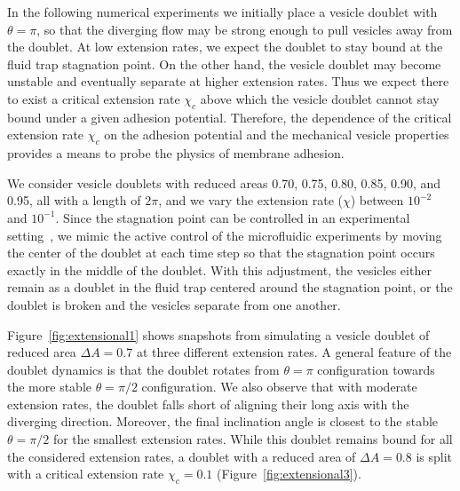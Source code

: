 \documentclass[prf,superscriptaddress,showkeys,longbibliography]{revtex4-1}
\begin{document}
In the following numerical experiments we initially place a vesicle
doublet with $\theta=\pi$, so that the diverging flow may be strong
enough to pull vesicles away from the doublet.  At low extension
rates, we expect the doublet to stay bound at the fluid trap stagnation
point.  On the other hand, the vesicle doublet may become unstable and
eventually separate at higher extension rates.  Thus we expect there
to exist a critical extension rate $\chi_c$ above which the vesicle
doublet cannot stay bound under a given adhesion potential.  Therefore,
the dependence of the critical extension rate $\chi_c$ on the adhesion
potential and the mechanical vesicle properties provides a means to
probe the physics of membrane adhesion.


We consider vesicle doublets with reduced areas 0.70, 0.75, 0.80, 0.85,
0.90, and 0.95, all with a length of $2\pi$, and we vary the extension
rate ($\chi$) between $10^{-2}$ and $10^{-1}$.  Since the stagnation
point can be controlled in an experimental
setting~\cite{BentleyLeal1986_JFMa,Johnson-Chavarria2011_EMJ}, we mimic the active control of
the microfluidic experiments by moving the center of the doublet at each
time step so that the stagnation point occurs exactly in the middle of
the doublet.  With this adjustment, the vesicles either remain as a
doublet in the fluid trap centered around the stagnation point, or the
doublet is broken and the vesicles separate from one another.  

Figure~\ref{fig:extensional1} shows snapshots from simulating a vesicle doublet of reduced area  $\Delta A = 0.7$
at three different extension rates. A general feature of the doublet dynamics is that the doublet rotates from
$\theta=\pi$ configuration towards the more stable $\theta=\pi/2$
configuration.  
%
We also
observe that with moderate extension rates, the doublet falls short of
aligning their long axis with the diverging direction.  Moreover, the
final inclination angle is closest to the stable $\theta=\pi/2$ for the
smallest extension rates. While this doublet remains bound for all
the considered extension rates, a doublet with a reduced area of
$\Delta A = 0.8$ is split with a critical extension rate $\chi_c =
0.1$ (Figure~\ref{fig:extensional3}).  
\end{document}
